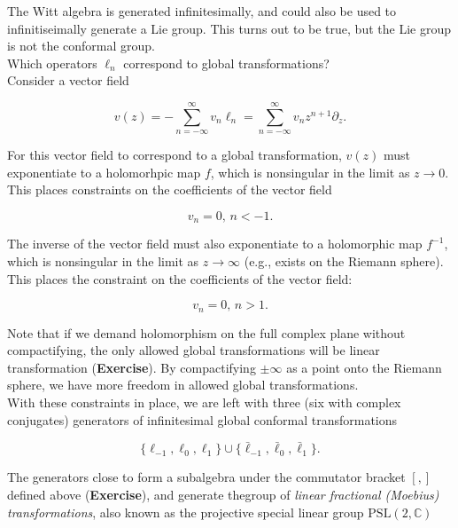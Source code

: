 \noindent The Witt algebra is generated infinitesimally, and could also be used to infinitiseimally generate a Lie group. This turns out to be true, but the Lie group is not the conformal group. \\

\noindent Which operators $\ell_n$ correspond to global transformations? \\

\noindent Consider a vector field 

\begin{equation}
v(z) = - \sum_{n=-\infty}^{\infty} v_n \ell_n = \sum_{n=-\infty}^{\infty} v_n z^{n+1} \partial_z.
\end{equation}

\noindent For this vector field to correspond to a global transformation, $v(z)$ must exponentiate to a holomorhpic map $f$, which is nonsingular in the limit as $z \rightarrow 0$. This places constraints on the coefficients of the vector field 

\begin{equation}
v_n = 0, \, n < -1.
\end{equation}

\noindent The inverse of the vector field must also exponentiate to a holomorphic map $f^{-1}$, which is nonsingular in the limit as $z \rightarrow \infty$ (e.g., exists on the Riemann sphere). This places the constraint on the coefficients of the vector field: 

\begin{equation}
v_n = 0, \, n>1.
\end{equation}

\noindent Note that if we demand holomorphism on the full complex plane without compactifying, the only allowed global transformations will be linear transformation (\textbf{Exercise}). By compactifying $\pm \infty$ as a point onto the Riemann sphere, we have more freedom in allowed global transformations. \\

\noindent With these constraints in place, we are left with three (six with complex conjugates) generators of infinitesimal global conformal transformations

\begin{equation}
\{ \ell_{-1}, \ell_0 , \ell_1 \} \cup \{ \bar{\ell}_{-1}, \bar{\ell}_0, \bar{\ell}_1 \}.
\end{equation}

\noindent The generators close to form a subalgebra under the commutator bracket $[,]$ defined above (\textbf{Exercise}), and generate thegroup of \textit{linear fractional (Moebius) transformations}, also known as the projective special linear group $\text{PSL}(2,\mathbb{C})$

